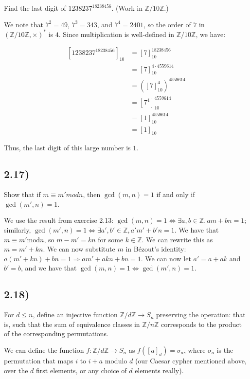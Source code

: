 Find the last digit of $1238237^{18238456}$. (Work in $\mathbb{Z}/10\mathbb{Z}$.)

We note that $7^2 = 49$, $7^3 = 343$, and $7^4 = 2401$, so the order of $7$ in $(\mathbb{Z}/10\mathbb{Z}, \times)^*$ is $4$.  Since multiplication is well-defined in $\mathbb{Z}/10\mathbb{Z}$, we have:

$$
\begin{aligned}
[1238237^{18238456}]_{10}
&= [7]_{10}^{18238456} \\
&= [7]_{10}^{4 \cdot 4559614} \\
&= ([7]_{10}^4)^{4559614} \\
&= [7^4]_{10}^{4559614} \\
&= [1]_{10}^{4559614} \\
&= [1]_{10}
\end{aligned}
$$

Thus, the last digit of this large number is $1$.


\subsection*{2.17)}

Show that if $m \equiv m' mod n$, then $\gcd(m, n) = 1$ if and only if $\gcd(m', n) = 1$.

We use the result from exercise 2.13: $\gcd(m, n) = 1 \Leftrightarrow \exists a, b \in \mathbb{Z}, am + bn = 1$; similarly, $\gcd(m', n) = 1 \Leftrightarrow \exists a', b' \in \mathbb{Z}, a'm' + b'n = 1$.  We have that $m \equiv m' \text{mod} n$, so $m - m' = kn$ for some $k \in \mathbb{Z}$. We can rewrite this as $m = m' + kn$. We can now substitute $m$ in Bézout's identity: $a(m' + kn) + bn = 1 \Rightarrow am' + akn + bn = 1$. We can now let $a' = a + ak$ and $b' = b$, and we have that $\gcd(m, n) = 1 \Leftrightarrow \gcd(m', n) = 1$.


\subsection*{2.18)}

For $d \leq n$, define an injective function $\mathbb{Z}/d\mathbb{Z} \to S_n$ preserving the operation: that is, such that the sum of equivalence classes in $\mathbb{Z}/n\mathbb{Z}$ corresponds to the product of the corresponding permutations.

We can define the function $f: \mathbb{Z}/d\mathbb{Z} \to S_n$ as $f([a]_d) = \sigma_a$, where $\sigma_a$ is the permutation that maps $i$ to $i + a$ modulo $d$ (our Caesar cypher mentioned above, over the $d$ first elements, or any choice of $d$ elements really).

